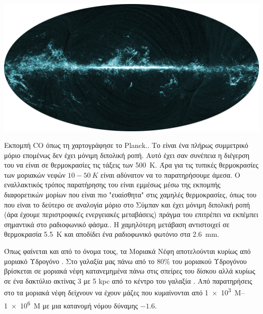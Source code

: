 \begin{marginfigure}
	\label{fig:CO}
	\centering
	\includegraphics[width=1\linewidth]{Images/CO.png}
	\caption{Εκπομπή CO όπως τη χαρτογράφησε το Planck.\cite{planck_2014}.
		\newline
		Το  είναι ένα πλήρως συμμετρικό μόριο επομένως δεν έχει μόνιμη διπολική ροπή. Αυτό έχει σαν συνέπεια η διέγερση του να είναι σε θερμοκρασίες τις τάξεις των \SI{500}{K}. Άρα για τις τυπικές θερμοκρασίες των μοριακών νεφών $10-50\ K$ είναι αδύνατον να το παρατηρήσουμε άμεσα.
		\newline
		Ο εναλλακτικός τρόπος παρατήρησης του  είναι εμμέσως μέσω της εκπομπής διαφορετικών μορίων που είναι πιο "ευαίσθητα" στις χαμηλές θερμοκρασίες, όπως του  που είναι το δεύτερο σε αναλογία μόριο στο Σύμπαν και έχει μόνιμη διπολική ροπή (άρα έχουμε περιστροφικές ενεργειακές μεταβάσεις) πράγμα του επιτρέπει να εκπέμπει σημαντικά στο ραδιοφωνικό φάσμα.. 
		\newline
		H χαμηλότερη μετάβαση αντιστοιχεί σε θερμοκρασία \SI{5.5}{K} και αποδίδει ένα ραδιοφωνικό φωτόνιο στα \SI{2.6}{mm}.
	}
	
\end{marginfigure}

Όπως φαίνεται και από το όνομα τους, τα Μοριακά Νέφη αποτελούνται κυρίως από μοριακό Υδρογόνο . Στο γαλαξία μας πάνω από το 80\% του μοριακού Υδρογόνου βρίσκεται σε μοριακά νέφη κατανεμημένα πάνω στις σπείρες του δίσκου αλλά κυρίως σε ένα δακτύλιο ακτίνας 3 με 5 kpc από το κέντρο του γαλαξία \cite{rathborne_2009}.  Από παρατηρήσεις στο  τα μοριακά νέφη δείχνουν να έχουν μάζες που κυμαίνονται από \SIrange{1e3}{1e6}{M_\odot} με μια κατανομή νόμου δύναμης $-1.6$. \cite{stahlern_2004}

